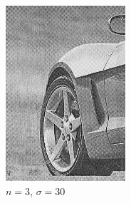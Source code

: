 \documentclass[
	12pt, %
]{style/fphw}
\begin{document}
\begin{figure}[H]
\begin{subfigure}[b]{.22\textwidth}
             \includegraphics[width=\textwidth]{plots2/Q5_3_2_30.png}
             \caption{$n=3$, $\sigma=30$}
             \label{Q5_3_3_30}
         \end{subfigure}
         \hfill
         \begin{subfigure}[b]{.22\textwidth}
             \centering

\end{subfigure}
\end{figure}
\end{document}

